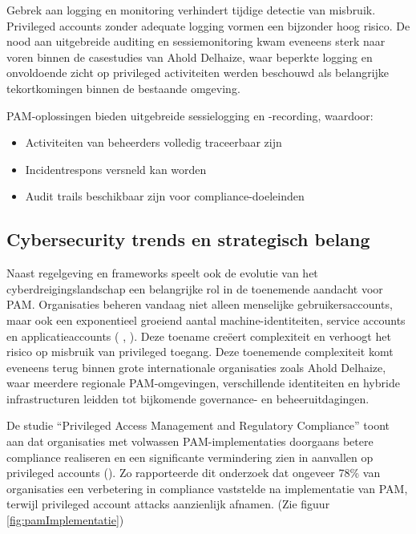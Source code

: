 Gebrek aan logging en monitoring verhindert tijdige detectie van misbruik. Privileged accounts zonder adequate logging vormen een bijzonder hoog risico. De nood aan uitgebreide auditing en sessiemonitoring kwam eveneens sterk naar voren binnen de casestudies van Ahold Delhaize, waar beperkte logging en onvoldoende zicht op privileged activiteiten werden beschouwd als belangrijke tekortkomingen binnen de bestaande omgeving.

PAM-oplossingen bieden uitgebreide sessielogging en -recording, waardoor:
\begin{itemize}
	\item Activiteiten van beheerders volledig traceerbaar zijn
	\item Incidentrespons versneld kan worden
	\item Audit trails beschikbaar zijn voor compliance-doeleinden
\end{itemize}

\subsection{Cybersecurity trends en strategisch belang}
\label{cybersecurity-trends-en-strategisch-belang}

Naast regelgeving en frameworks speelt ook de evolutie van het cyberdreigingslandschap een belangrijke rol in de toenemende aandacht voor PAM. Organisaties beheren vandaag niet alleen menselijke gebruikersaccounts, maar ook een exponentieel groeiend aantal machine-identiteiten, service accounts en applicatieaccounts (\cite{ForresterWavePIM2025} \cite{KuppingerColePAM2024}, \cite{GartnerMagicQuadrantPAM2025}).  Deze toename creëert complexiteit en verhoogt het risico op misbruik van privileged toegang. Deze toenemende complexiteit komt eveneens terug binnen grote internationale organisaties zoals Ahold Delhaize, waar meerdere regionale PAM-omgevingen, verschillende identiteiten en hybride infrastructuren leidden tot bijkomende governance- en beheeruitdagingen.

De studie “Privileged Access Management and Regulatory Compliance” toont aan dat organisaties met volwassen PAM-implementaties doorgaans betere compliance realiseren en een significante vermindering zien in aanvallen op privileged accounts (\cite{Mandru2024PAMCompliance}). Zo rapporteerde dit onderzoek dat ongeveer 78\% van organisaties een verbetering in compliance vaststelde na implementatie van PAM, terwijl privileged account attacks aanzienlijk afnamen. (Zie figuur \ref{fig:pamImplementatie})

